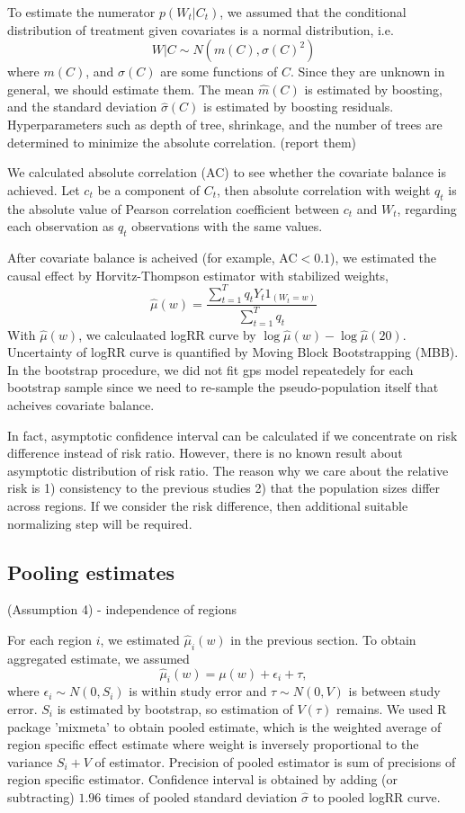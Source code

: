 \documentclass[12pt]{article}
\begin{document}
To estimate the numerator $p(W_t \lvert C_t)$, 
we assumed that the conditional distribution of treatment given covariates is a normal distribution, i.e.
\[ 
	W\lvert C \sim N(m(C), \sigma(C)^2) 
\] 
where $m(C)$, and $\sigma(C)$ are some functions of $C$.
Since they are unknown in general, we should estimate them. 
The mean $\hat{m}(C)$ is estimated by boosting, 
and the standard deviation $\hat{\sigma}(C)$ is estimated by boosting residuals\cite{hirano2004, gpsboosting2015}.
Hyperparameters such as depth of tree, shrinkage, and the number of trees are determined
to minimize the absolute correlation. (report them)

We calculated absolute correlation (AC)\cite{gpsboosting2015} 
to see whether the covariate balance is achieved.
Let $c_t$ be a component of $C_t$, then absolute correlation with weight $q_t$ is
the absolute value of Pearson correlation coefficient between $c_t$ and $W_t$,
regarding each observation as $q_t$ observations with the same values.

After covariate balance is acheived (for example, AC$<0.1$), 
we estimated the causal effect by Horvitz-Thompson estimator with stabilized weights,
\[
	\hat{\mu}(w) = \frac{\sum_{t = 1}^T q_t Y_t 1_{(W_t = w)}}{\sum_{t = 1}^T q_t}
\]
With $\hat{\mu}(w)$, we calculaated logRR curve by $\log\hat{\mu}(w) - \log \hat{\mu}(20)$.
Uncertainty of logRR curve is quantified by Moving Block Bootstrapping (MBB)\cite{mbb1989}.
In the bootstrap procedure, we did not fit gps model repeatedely for each bootstrap sample
since we need to re-sample the pseudo-population itself that acheives covariate balance.

In fact, asymptotic confidence interval can be calculated 
if we concentrate on risk difference instead of risk ratio.
However, there is no known result about asymptotic distribution of risk ratio.
The reason why we care about the relative risk is
1) consistency to the previous studies
2) that the population sizes differ across regions.
If we consider the risk difference, then additional suitable normalizing step will be required.

\subsection{Pooling estimates}

(Assumption 4) - independence of regions

For each region $i$, we estimated $\hat{\mu}_i(w)$ in the previous section.
To obtain aggregated estimate,
we assumed
\[
	\hat{\mu}_i(w) = \mu(w) + \epsilon_i + \tau,
\]
where $\epsilon_i \sim N(0, S_i)$ is within study error and $\tau \sim N(0, V)$ is between study error.
$S_i$ is estimated by bootstrap,
so estimation of $V(\tau)$ remains.
We used R package 'mixmeta' to obtain pooled estimate,
which is the weighted average of region specific effect estimate
where weight is inversely proportional to the variance $S_i + V$ of estimator.
Precision of pooled estimator is sum of precisions of region specific estimator.
Confidence interval is obtained by adding (or subtracting) 
$1.96$ times of pooled standard deviation $\hat{\sigma}$ to pooled logRR curve.
\end{document}
